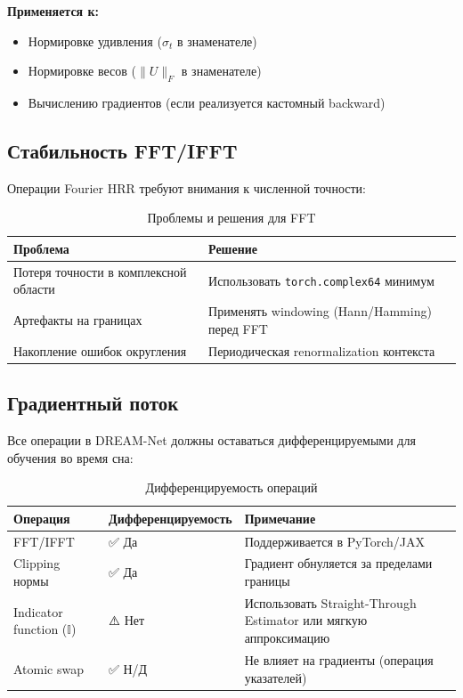 \textbf{Применяется к:}
\begin{itemize}
    \item Нормировке удивления ($\sigma_t$ в знаменателе)
    \item Нормировке весов ($\|U\|_F$ в знаменателе)
    \item Вычислению градиентов (если реализуется кастомный backward)
\end{itemize}

\subsection{Стабильность FFT/IFFT}

Операции Fourier HRR требуют внимания к численной точности:

\begin{table}[h]
\centering
\caption{Проблемы и решения для FFT}
\label{tab:fft_stability}
\begin{tabular}{lp{8cm}}
\toprule
\textbf{Проблема} & \textbf{Решение} \\
\midrule
Потеря точности в комплексной области & Использовать \texttt{torch.complex64} минимум \\
Артефакты на границах & Применять windowing (Hann/Hamming) перед FFT \\
Накопление ошибок округления & Периодическая renormalization контекста \\
\bottomrule
\end{tabular}
\end{table}

\subsection{Градиентный поток}

Все операции в DREAM-Net должны оставаться дифференцируемыми для обучения во время сна:

\begin{table}[h]
\centering
\caption{Дифференцируемость операций}
\label{tab:gradient_flow}
\begin{tabular}{lp{3cm}p{6cm}}
\toprule
\textbf{Операция} & \textbf{Дифференцируемость} & \textbf{Примечание} \\
\midrule
FFT/IFFT & ✅ Да & Поддерживается в PyTorch/JAX \\
Clipping нормы & ✅ Да & Градиент обнуляется за пределами границы \\
Indicator function ($\mathbb{I}$) & ⚠️ Нет & Использовать Straight-Through Estimator или мягкую аппроксимацию \\
Atomic swap & ✅ Н/Д & Не влияет на градиенты (операция указателей) \\
\bottomrule
\end{tabular}
\end{table}

